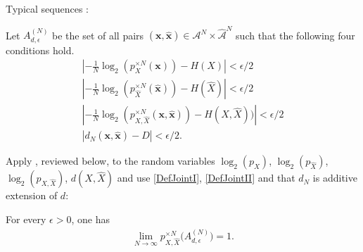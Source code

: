 \begin{frame}{Typical sequences}
:
\bit
\item Let $A_{d, \epsilon}^{(N)}$ be the set of all pairs 
$(\mathbf{x},\hat{\mathbf{x}})\in\mathcal{A}^N\times{\hat{\mathcal{A}}}^N$ 
such that the following four conditions hold. 
\small
\begin{align}
\left|-\frac{1}{N}\log_2(p_X^{\times N}(\mathbf{x}))-H(X)\right|<\epsilon/2\label{FirstEqEntrTyp}\\
\left|-\frac{1}{N}\log_2(p_{\hat{X}}^{\times N}(\hat{\mathbf{x}}))-H(\hat{X})\right|<\epsilon/2\label{SecondEqEntrTyp}\\
\left|-\frac{1}{N}\log_2(p_{X,\hat{X}}^{\times N}(\mathbf{x},\hat{\mathbf{x}}))-H(X,\hat{X}))\right|<\epsilon/2\label{ThirdEqEntrTyp}\\
\left|d_N(\mathbf{x},\hat{\mathbf{x}})-D\right|<\epsilon/2\label{EqDistTypical}.
\end{align}
\normalsize
%
%
\item Apply , reviewed below, to the random variables $\log_2(p_X)$, $\log_2(p_{\hat{X}})$, $\log_2(p_{X,\hat{X}})$, $d(X,\hat{X})$ and use 
\eqref{DefJointI}, \eqref{DefJointII} and that $d_N$ is additive extension of $d$: 
\item[\iarrow] For every $\epsilon>0$, one has 
\begin{align}\label{ProbTypicalSet}
\lim_{N\to\infty} p_{X,\hat{X}}^{\times N}\bigl(A_{d, \epsilon}^{(N)}\bigr)=1. 
\end{align}
\eit 

\end{frame}


